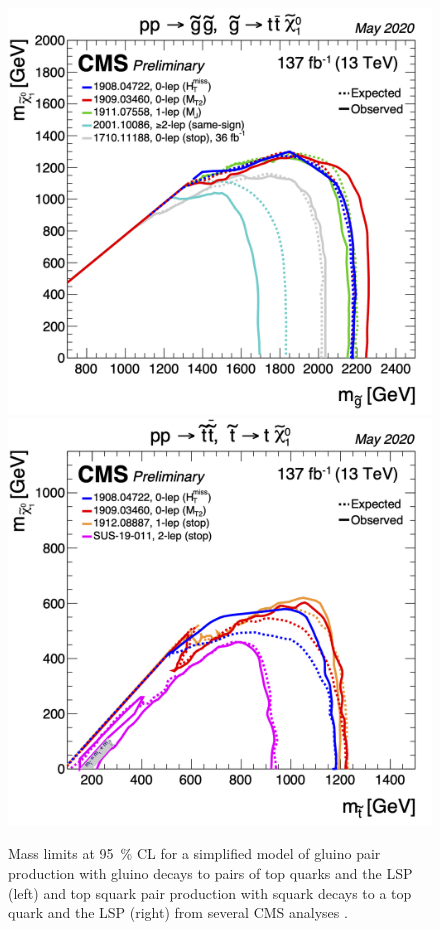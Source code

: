 \begin{figure}[hbtp]
\centering
\includegraphics[scale=0.35]{figures/intro/gluino_mass_limits.png}
\includegraphics[scale=0.35]{figures/intro/stop_mass_limits.png}
\caption{Mass limits at \SI{95}{\percent} CL for a simplified model of gluino pair production with gluino decays to pairs of top quarks and the LSP (left) and top squark pair production with squark decays to a top quark and the LSP (right) from several CMS analyses \cite{cms_susy_public_results}.}
\label{cms_susy_summary}
\end{figure}